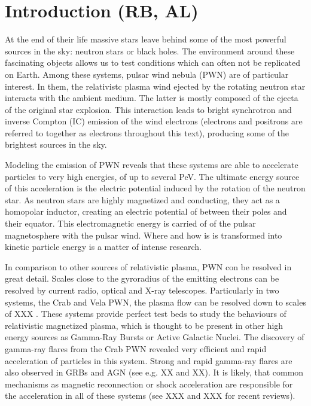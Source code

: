 \section{Introduction (RB, AL)}
At the end of their life massive stars leave behind some of the most powerful sources in the sky: neutron stars or black holes. The environment around these fascinating objects allows
us to test conditions which can often not be replicated on Earth. Among these systems, pulsar wind nebula (PWN) are of particular interest. In them, the relativistc plasma wind ejected by the rotating neutron star interacts with the ambient medium. The latter is mostly composed of the ejecta of the original star explosion. This interaction leads to bright synchrotron and inverse Compton (IC) emission of the wind electrons (electrons and positrons are referred to together as electrons throughout this text), producing some of the brightest sources in the sky.

Modeling the emission of PWN reveals that these systems are able to accelerate particles to very high energies, of up to several PeV. The ultimate energy source of this acceleration is the electric potential induced by the rotation of the neutron star. As neutron stars are highly magnetized and conducting, they act as a homopolar inductor, creating an electric potential of between their poles and their equator. This electromagnetic energy is carried of of the pulsar magnetosphere with the pulsar wind. Where and how is is transformed into kinetic particle energy is a matter of intense research.

In comparison to other sources of relativistic plasma, PWN con be resolved in great detail. Scales close to the gyroradius of the emitting electrons can be resolved by current radio, optical and X-ray telescopes. Particularly in two systems, the Crab and Vela PWN, the plasma flow can be resolved down to scales of XXX . These systems provide perfect test beds to study the behaviours of relativistic magnetized plasma, which is thought to be present in other high energy sources as Gamma-Ray Bursts or Active Galactic Nuclei. The discovery of gamma-ray flares from the Crab PWN revealed very efficient and rapid acceleration of particles in this system. Strong and rapid gamma-ray flares are also observed in GRBs and AGN (see e.g. XX and XX). It is likely, that common mechanisms as magnetic reconnection or shock acceleration are responsible for the acceleration in all of these systems (see XXX and XXX for recent reviews).

